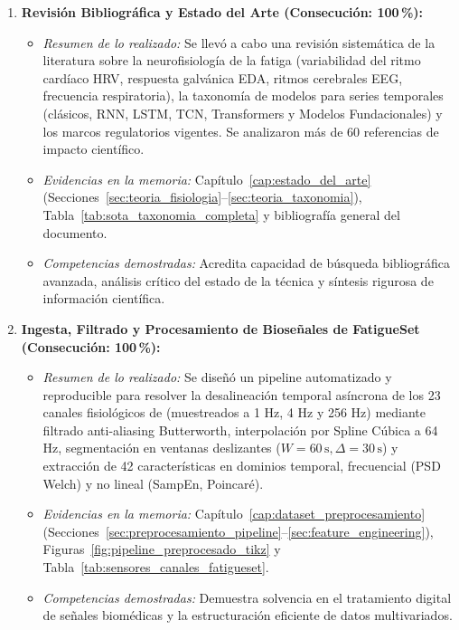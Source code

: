 \begin{enumerate}[label=\textbf{OE\arabic*.}, leftmargin=1.8cm]
    \item \textbf{Revisión Bibliográfica y Estado del Arte (Consecución: 100\,\%):}
    \begin{itemize}
        \item \textit{Resumen de lo realizado:} Se llevó a cabo una revisión sistemática de la literatura sobre la neurofisiología de la fatiga (variabilidad del ritmo cardíaco HRV, respuesta galvánica EDA, ritmos cerebrales EEG, frecuencia respiratoria), la taxonomía de modelos para series temporales (clásicos, RNN, LSTM, TCN, Transformers y Modelos Fundacionales) y los marcos regulatorios vigentes. Se analizaron más de 60 referencias de impacto científico.
        \item \textit{Evidencias en la memoria:} Capítulo~\ref{cap:estado_del_arte} (Secciones~\ref{sec:teoria_fisiologia}--\ref{sec:teoria_taxonomia}), Tabla~\ref{tab:sota_taxonomia_completa} y bibliografía general del documento.
        \item \textit{Competencias demostradas:} Acredita capacidad de búsqueda bibliográfica avanzada, análisis crítico del estado de la técnica y síntesis rigurosa de información científica.
    \end{itemize}

    \item \textbf{Ingesta, Filtrado y Procesamiento de Bioseñales de FatigueSet (Consecución: 100\,\%):}
    \begin{itemize}
        \item \textit{Resumen de lo realizado:} Se diseñó un pipeline automatizado y reproducible para resolver la desalineación temporal asíncrona de los 23 canales fisiológicos de \fatigueset{} (muestreados a 1 Hz, 4 Hz y 256 Hz) mediante filtrado anti-aliasing Butterworth, interpolación por Spline Cúbica a 64 Hz, segmentación en ventanas deslizantes ($W=60\,\text{s}, \Delta=30\,\text{s}$) y extracción de 42 características en dominios temporal, frecuencial (PSD Welch) y no lineal (SampEn, Poincaré).
        \item \textit{Evidencias en la memoria:} Capítulo~\ref{cap:dataset_preprocesamiento} (Secciones~\ref{sec:preprocesamiento_pipeline}--\ref{sec:feature_engineering}), Figuras~\ref{fig:pipeline_preprocesado_tikz} y Tabla~\ref{tab:sensores_canales_fatigueset}.
        \item \textit{Competencias demostradas:} Demuestra solvencia en el tratamiento digital de señales biomédicas y la estructuración eficiente de datos multivariados.
    \end{itemize}


\end{enumerate}

